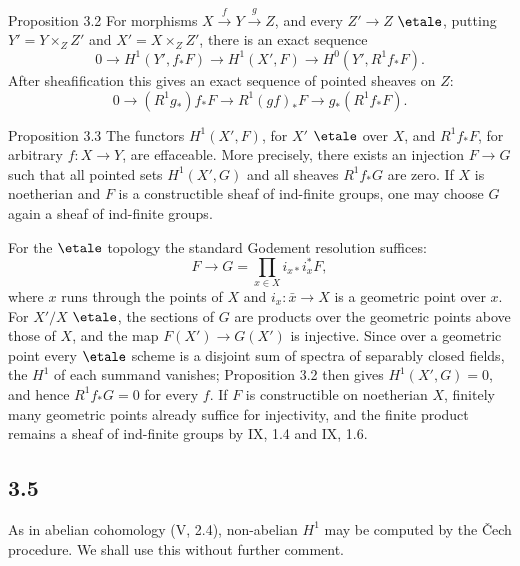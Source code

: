 \begin{statement}{Proposition 3.2}
For morphisms \(X\xrightarrow fY\xrightarrow gZ\), and every \(Z'\to Z\) \(\etale\), putting \(Y'=Y\times_ZZ'\) and \(X'=X\times_ZZ'\), there is an exact sequence
\[
0\to H^1(Y',f_*F)\to H^1(X',F)\to H^0(Y',R^1f_*F).
\]
After sheafification this gives an exact sequence of pointed sheaves on \(Z\):
\[
0\to (R^1g_*)f_*F\to R^1(gf)_*F\to g_*(R^1f_*F).
\]
\end{statement}

\begin{statement}{Proposition 3.3}
The functors \(H^1(X',F)\), for \(X'\) \(\etale\) over \(X\), and \(R^1f_*F\), for arbitrary \(f:X\to Y\), are effaceable. More precisely, there exists an injection \(F\to G\) such that all pointed sets \(H^1(X',G)\) and all sheaves \(R^1f_*G\) are zero. If \(X\) is noetherian and \(F\) is a constructible sheaf of ind-finite groups, one may choose \(G\) again a sheaf of ind-finite groups.
\end{statement}

\begin{prooftext}
For the \(\etale\) topology the standard Godement resolution suffices:
\[
F\longrightarrow G=\prod_{x\in X}i_{x*}i_x^*F,
\tag{3.4}
\]
where \(x\) runs through the points of \(X\) and \(i_x:\bar x\to X\) is a geometric point over \(x\). For \(X'/X\) \(\etale\), the sections of \(G\) are products over the geometric points above those of \(X\), and the map \(F(X')\to G(X')\) is injective. Since over a geometric point every \(\etale\) scheme is a disjoint sum of spectra of separably closed fields, the \(H^1\) of each summand vanishes; Proposition 3.2 then gives \(H^1(X',G)=0\), and hence \(R^1f_*G=0\) for every \(f\). If \(F\) is constructible on noetherian \(X\), finitely many geometric points already suffice for injectivity, and the finite product remains a sheaf of ind-finite groups by IX, 1.4 and IX, 1.6.
\end{prooftext}

\subsection*{3.5}
As in abelian cohomology (V, 2.4), non-abelian \(H^1\) may be computed by the \v{C}ech procedure. We shall use this without further comment.

